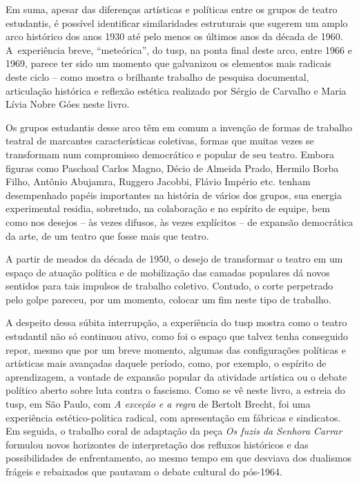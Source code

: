 {\subject{Arco histórico}

Em suma, apesar das diferenças artísticas e políticas entre os grupos de
teatro estudantis, é possível identificar similaridades estruturais que
sugerem um amplo arco histórico dos anos 1930 até pelo menos os últimos
anos da década de 1960. A~experiência breve, “meteórica”, do {\sc tusp}, na
ponta final deste arco, entre 1966 e 1969, parece ter sido um momento
que galvanizou os elementos mais radicais deste ciclo -- como mostra o
brilhante trabalho de pesquisa documental, articulação histórica e
reflexão estética realizado por Sérgio de Carvalho e Maria Lívia Nobre
Góes neste livro.

Os grupos estudantis desse arco têm em comum a invenção de formas de
trabalho teatral de marcantes características coletivas, formas que
muitas vezes se transformam num compromisso democrático e popular de seu
teatro. Embora figuras como Paschoal Carlos Magno, Décio de Almeida
Prado, Hermilo Borba Filho, Antônio Abujamra, Ruggero Jacobbi, Flávio
Império etc. tenham desempenhado papéis importantes na história de
vários dos grupos, sua energia experimental residia, sobretudo, na
colaboração e no espírito de equipe, bem como nos desejos -- às vezes
difusos, às vezes explícitos -- de expansão democrática da arte, de um
teatro que fosse mais que teatro.

A partir de meados da década de 1950, o desejo de transformar o teatro
em um espaço de atuação política e de mobilização das camadas populares
dá novos sentidos para tais impulsos de trabalho coletivo. Contudo, o
corte perpetrado pelo golpe pareceu, por um momento, colocar um fim
neste tipo de trabalho.

A despeito dessa súbita interrupção, a experiência do {\sc tusp} mostra como o
teatro estudantil não só continuou ativo, como foi o espaço que talvez
tenha conseguido repor, mesmo que por um breve momento, algumas das
configurações políticas e artísticas mais avançadas daquele período,
como, por exemplo, o espírito de aprendizagem, a vontade de expansão
popular da atividade artística ou o debate político aberto sobre luta
contra o fascismo. Como se vê neste livro, a estreia do {\sc tusp}, em São
Paulo, com {\it A exceção e a regra} de Bertolt Brecht, foi uma
experiência estético-politica radical, com apresentação em fábricas e
sindicatos. Em seguida, o trabalho coral de adaptação da peça {\it Os
fuzis da Senhora Carrar} formulou novos horizontes de interpretação dos
refluxos históricos e das possibilidades de enfrentamento, ao mesmo
tempo em que desviava dos dualismos frágeis e rebaixados que pautavam o
debate cultural do pós-1964.

}
